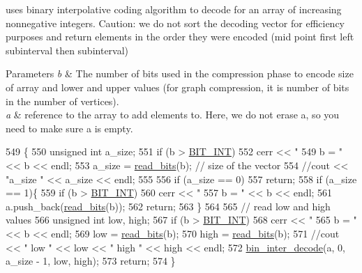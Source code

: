 uses binary interpolative coding algorithm to decode for an array of increasing nonnegative integers. Caution\+: we do not sort the decoding vector for efficiency purposes and return elements in the order they were encoded (mid point first left subinterval then subinterval) 


\begin{DoxyParams}{Parameters}
{\em b} & The number of bits used in the compression phase to encode size of array and lower and upper values (for graph compression, it is number of bits in the number of vertices). \\
\hline
{\em a} & reference to the array to add elements to. Here, we do not erase a, so you need to make sure a is empty. \\
\hline
\end{DoxyParams}

\begin{DoxyCode}
549                                                       \{
550   \textcolor{keywordtype}{unsigned} \textcolor{keywordtype}{int} a\_size;
551   \textcolor{keywordflow}{if} (b > \hyperlink{bitstream_8h_afcadf5aa65c5159bfb96c4d82ebc0a5d}{BIT\_INT})
552     cerr << \textcolor{stringliteral}{" 549 b = "} << b << endl;
553   a\_size = \hyperlink{classibitstream_a2fdcaecf10fefa6942dcd5286a2696e0}{read\_bits}(b); \textcolor{comment}{// size of the vector}
554   \textcolor{comment}{//cout << "a\_size " << a\_size << endl;}
555 
556   \textcolor{keywordflow}{if} (a\_size == 0)
557     \textcolor{keywordflow}{return};
558   \textcolor{keywordflow}{if} (a\_size == 1)\{
559     \textcolor{keywordflow}{if} (b > \hyperlink{bitstream_8h_afcadf5aa65c5159bfb96c4d82ebc0a5d}{BIT\_INT})
560       cerr << \textcolor{stringliteral}{" 557 b = "} << b << endl;
561     a.push\_back(\hyperlink{classibitstream_a2fdcaecf10fefa6942dcd5286a2696e0}{read\_bits}(b));
562     \textcolor{keywordflow}{return};
563   \}
564 
565   \textcolor{comment}{// read low and high values}
566   \textcolor{keywordtype}{unsigned} \textcolor{keywordtype}{int} low, high;
567   \textcolor{keywordflow}{if} (b > \hyperlink{bitstream_8h_afcadf5aa65c5159bfb96c4d82ebc0a5d}{BIT\_INT})
568     cerr << \textcolor{stringliteral}{" 565 b = "} << b << endl;
569   low = \hyperlink{classibitstream_a2fdcaecf10fefa6942dcd5286a2696e0}{read\_bits}(b);
570   high = \hyperlink{classibitstream_a2fdcaecf10fefa6942dcd5286a2696e0}{read\_bits}(b);
571   \textcolor{comment}{//cout << " low " << low << " high " << high << endl;}
572   \hyperlink{classibitstream_a4d1bfd02f98f6af2ac4d80034b23e26d}{bin\_inter\_decode}(a, 0, a\_size - 1, low, high);
573   \textcolor{keywordflow}{return};
574 \}
\end{DoxyCode}
\mbox{\label{classibitstream_a97983c20903c908fafb26e250bf9e812}} 
